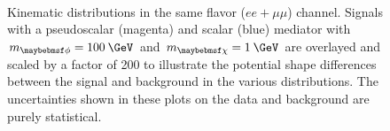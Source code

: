 \begin{figure}
  \centering
   \\
  \caption{Kinematic distributions in the same flavor ($ee+\mu\mu$) channel. Signals with a pseudoscalar (magenta) and scalar (blue) mediator with $\mMed=100\:\GeV$ and $\mDM=1\:\GeV$ are overlayed and scaled by a factor of 200 to illustrate the potential shape differences between the signal and background in the various distributions. The uncertainties shown in these plots on the data and background are purely statistical.}
  \label{fig:dilep_sr_sf}
\end{figure}

